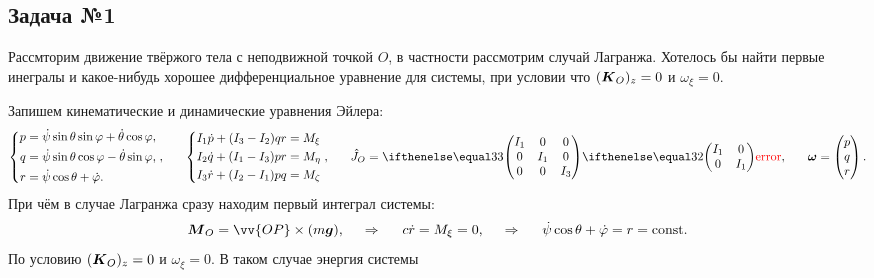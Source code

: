 \subsection*{Задача №1}

Рассмторим движение твёржого тела с неподвижной точкой $O$, в частности рассмотрим случай Лагранжа. Хотелось бы найти первые инегралы и какое-нибудь хорошее дифференциальное уравнение для системы, при условии что $(\mbox{\boldmath $K$}_O)_z = 0$ и $\omega_\xi = 0$.

Запишем кинематические и динамические уравнения Эйлера: 
\begin{equation*}
    \left\{\begin{aligned}
        p &= \dot{\psi} \sin \theta \sin \varphi + \dot{\theta} \cos \varphi,\\
        q &= \dot{\psi} \sin \theta \cos \varphi - \dot{\theta} \sin \varphi,\\
        r &= \dot{\psi} \cos \theta + \dot{\varphi}.
    \end{aligned}\right.,
    \hspace{0.6cm} 
    \left\{\begin{aligned}
        I_1 \dot{p} + (I_3-I_2) q r &= M_{\xi} \\
        I_2 \dot{q} + (I_1-I_3) p r &= M_{\eta} \\
        I_3 \dot{r} + (I_2-I_1) p q &= M_{\zeta} \\
    \end{aligned}\right.,   
    \hspace{0.6cm} 
    \hat{J}_O = \dmat{3}{I_1}{I_1}{I_3}, \hspace{0.6cm} 
    \vc{\omega} = \begin{pmatrix}
        p \\ q \\ r
    \end{pmatrix}.
\end{equation*}
При чём в случае Лагранжа сразу находим первый интеграл системы:
\begin{equation}
    \vc{M}_O = \vv{OP} \times (m \vc{g}), 
    \hspace{0.5cm} \Rightarrow \hspace{0.5cm} 
    c \dot{r} = M_{\xi} = 0,
    \hspace{0.5cm} \Rightarrow \hspace{0.5cm} 
    \dot{\psi} \cos \theta + \dot{\varphi} = r =\const.
\end{equation}
По условию $(\mbox{\boldmath $K$}_O)_z = 0$ и $\omega_\xi = 0$. В таком случае энергия системы 
